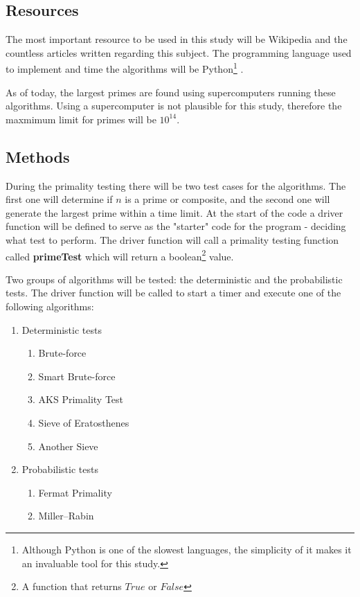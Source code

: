 \documentclass[main.tex]{subfiles}
\begin{document}
\subsection{Resources}

The most important resource to be used in this study will be Wikipedia and the countless articles written regarding this subject. The programming language used to implement and time the algorithms will be Python\footnote{Although Python is one of the slowest languages, the simplicity of it makes it an invaluable tool for this study.} \cite{python}.

As of today, the largest primes are found using supercomputers running these algorithms. Using a supercomputer is not plausible for this study, therefore the maxmimum limit for primes will be $10^{14}$.

\subsection{Methods}
During the primality testing \cite{prime:test} there will be two test cases for the algorithms. The first one will determine if $n$ is a prime or composite, and the second one will generate the largest prime within a time limit. At the start of the code a driver function will be defined to serve as the "starter" code for the program - deciding what test to perform. The driver function will call a primality testing function called \textbf{primeTest} which will return a boolean\footnote{A function that returns $True$ or $False$} value. 

Two groups of algorithms will be tested: the deterministic and the probabilistic tests. The driver function will be called to start a timer and execute one of the following algorithms:
\begin{enumerate}
    \item Deterministic tests \cite{algh:determ}
    \begin{enumerate}
        \item Brute-force
        \item Smart Brute-force
        \item AKS Primality Test \cite{algh:AKS}
        \item Sieve of Eratosthenes \cite{algh:sieve}
        \item Another Sieve
    \end{enumerate}
    \item Probabilistic tests \cite{algh:probab}
    \begin{enumerate}
        \item Fermat Primality \cite{algh:fermat}
        \item Miller–Rabin \cite{algh:miller}
    \end{enumerate}
\end{enumerate}
\end{document}
